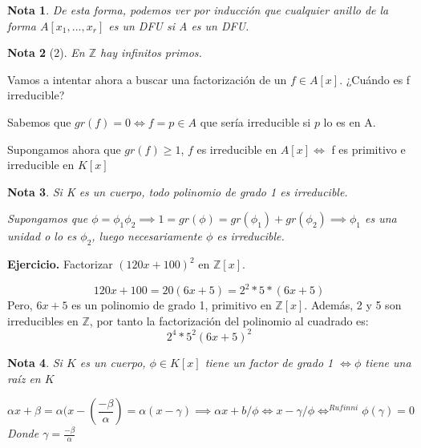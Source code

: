 \documentclass[11pt, a4paper, titlepage]{article}
\makeatletter
\renewenvironment{proof}[1][\proofname] {\vspace{-15pt}\par\pushQED{\qed}\normalfont\topsep6\p@\@plus6\p@\relax\trivlist\item[\hskip\labelsep\it#1\@addpunct{.}]\ignorespaces}{\popQED\endtrivlist\@endpefalse}
\providecommand{\ent}{\mathbb{Z}}
\theoremstyle{theorem-style}
\theoremstyle{definition-style}
\theoremstyle{remark-style}
\newtheorem*{nota}{Nota}
\theoremstyle{example-style}
\makeatother
\begin{document}
\begin{nota}
	De esta forma, podemos ver por inducción que cualquier anillo de la forma $A[x_1,...,x_r] $ es un DFU si A es un DFU.
\end{nota}
\begin{nota}[2]
	En $\ent$ hay infinitos primos. 

\end{nota}

Vamos a intentar ahora a buscar una factorización de un $f \in A[x]$. ¿Cuándo es f irreducible?

 Sabemos que $gr(f) = 0 \iff f = p \in A$ que sería irreducible si $p$ lo es en A.
 
 Supongamos ahora que $gr(f) \geq 1$, $f$ es irreducible en $A[x] \iff$ f es primitivo e irreducible en $K[x]$

\begin{nota}
	Si K es un cuerpo, todo polinomio de grado 1 es irreducible.
	\begin{proof}
	Supongamos que $\phi = \phi_1 \phi_2 \implies 1 = gr(\phi) =  gr(\phi_1)+gr(\phi_2) \implies \phi_1$ es una unidad o lo es $\phi_2$, luego necesariamente $\phi$ es irreducible.  
\end{proof}
\end{nota}


\textbf{Ejercicio.} Factorizar $(120x+100)^2$ en $\ent[x]$.

\[
120x+100 = 20(6x+5) = 2^2*5*(6x+5)
\]
Pero, $6x+5$ es un polinomio de grado 1, primitivo en $\ent[x]$. Además, 2 y 5 son irreducibles en $\ent$, por tanto la factorización del polinomio al cuadrado es:
\[
2^4*5^2(6x+5)^2
\]

\begin{nota}
	Si $K$ es un cuerpo, $\phi \in K[x]$ tiene un factor de grado 1 $\iff \phi$ tiene una raíz en $K$
	\begin{proof}
	$$\alpha x + \beta = \alpha(x-(\frac{-\beta}{\alpha}) = \alpha(x - \gamma) \implies \alpha x+b/\phi \iff x-\gamma / \phi \iff^{Rufinni} \phi(\gamma) = 0$$
	Donde $\gamma = \frac{-\beta}{\alpha}$
\end{proof}
\end{nota}
\end{document}

